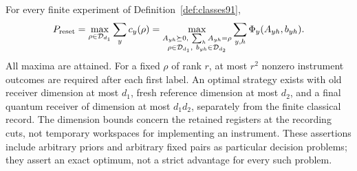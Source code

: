 \begin{theorem}\label{thm:resetvariational91}
For every finite experiment of Definition~\ref{def:classes91},
\begin{equation}\label{eq:resetvariational91}
 P_{\rm reset}=\max_{\rho\in\mathcal D_{d_1}}\sum_yc_y(\rho)
 =\max_{\substack{A_{yh}\succeq0,\ \sum_hA_{yh}=\rho\\
                    \rho\in\mathcal D_{d_1},\ b_{yh}\in\mathcal D_{d_2}}}
                    \sum_{y,h}\Phi_y(A_{yh},b_{yh}).
\end{equation}
All maxima are attained.  For a fixed $\rho$ of rank $r$, at most $r^2$
nonzero instrument outcomes are required after each first label.
An optimal strategy exists with old receiver dimension at most $d_1$,
fresh reference dimension at most $d_2$, and a final quantum receiver
of dimension at most $d_1d_2$, separately from the finite classical
record.  The dimension bounds concern the retained registers at the recording
cuts, not temporary workspaces for implementing an instrument.
These assertions include arbitrary priors and arbitrary fixed
pairs as particular decision problems; they assert an exact optimum,
not a strict advantage for every such problem.
\end{theorem}
